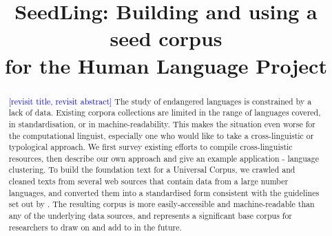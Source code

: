 \documentclass[11pt]{article}
\title{SeedLing: Building and using a seed corpus \\ for the Human Language Project}
\date{}
\begin{document}
\maketitle
\begin{abstract}
\textcolor{blue}{[revisit title, revisit abstract]}
The study of endangered languages is constrained by a lack of data. Existing corpora collections are limited in the range of languages covered, in standardisation, or in machine-readability. This makes the situation even worse for the computational linguist, especially one who would like to take a cross-linguistic or typological approach. We first survey existing efforts to compile cross-linguistic resources, then describe our own approach and give an example application - language clustering. To build the foundation text for a Universal Corpus, we crawled and cleaned texts from several web sources that contain data from a large number languages, and converted them into a standardised form consistent with the guidelines set out by . The resulting corpus is more easily-accessible and machine-readable than any of the underlying data sources, and represents a significant base corpus for researchers to draw on and add to in the future.
\end{abstract}




%



%



\end{document}
